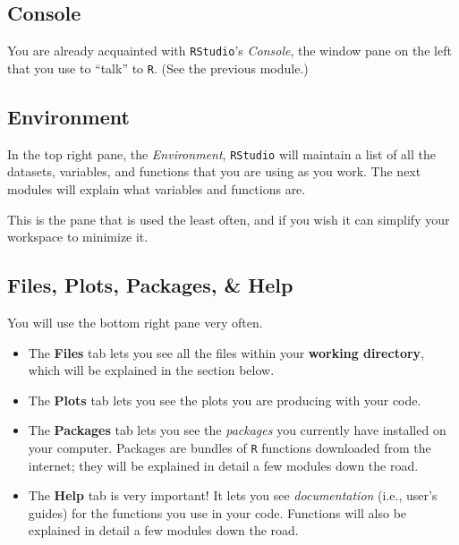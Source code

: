 \documentclass[
]{book}
\providecommand{\tightlist}{%
  \setlength{\itemsep}{0pt}\setlength{\parskip}{0pt}}
\begin{document}
\hypertarget{console}{%
\subsection*{Console}\label{console}}

You are already acquainted with \texttt{RStudio}'s \emph{Console}, the window pane on the left that you use to ``talk'' to \texttt{R}. (See the previous module.)

\hypertarget{environment}{%
\subsection*{Environment}\label{environment}}

In the top right pane, the \emph{Environment}, \texttt{RStudio} will maintain a list of all the datasets, variables, and functions that you are using as you work. The next modules will explain what variables and functions are.

This is the pane that is used the least often, and if you wish it can simplify your workspace to minimize it.

\hypertarget{files-plots-packages-help}{%
\subsection*{Files, Plots, Packages, \& Help}\label{files-plots-packages-help}}

You will use the bottom right pane very often.

\begin{itemize}
\tightlist
\item
  The \textbf{Files} tab lets you see all the files within your \textbf{working directory}, which will be explained in the section below.\\
\item
  The \textbf{Plots} tab lets you see the plots you are producing with your code.\\
\item
  The \textbf{Packages} tab lets you see the \emph{packages} you currently have installed on your computer. Packages are bundles of \texttt{R} functions downloaded from the internet; they will be explained in detail a few modules down the road.\\
\item
  The \textbf{Help} tab is very important! It lets you see \emph{documentation} (i.e., user's guides) for the functions you use in your code. Functions will also be explained in detail a few modules down the road.
\end{itemize}
\end{document}
